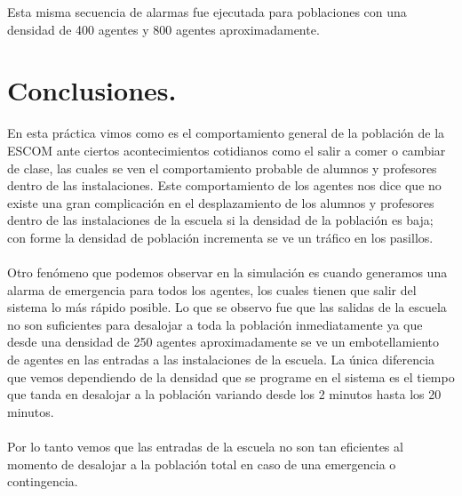 \documentclass[a4paper,10pt]{article}
\begin{document}
Esta misma secuencia de alarmas fue ejecutada para poblaciones  con una densidad de 400 agentes y 800 agentes aproximadamente.

\newpage

\section{Conclusiones.}

En esta pr\'actica vimos como es el comportamiento general de la poblaci\'on de la ESCOM ante ciertos acontecimientos cotidianos como el salir a comer o cambiar de clase, las cuales se ven el comportamiento probable de alumnos y profesores dentro de las instalaciones. Este comportamiento de los agentes nos dice que no existe una gran complicaci\'on en el desplazamiento de los alumnos y profesores dentro de las instalaciones de la escuela si la densidad de la poblaci\'on es baja; con forme la densidad de poblaci\'on incrementa se ve un tr\'afico en los pasillos.
\\ \\
Otro fen\'omeno que podemos observar en la simulaci\'on es cuando generamos una alarma de emergencia para todos los agentes, los cuales tienen que salir del sistema lo m\'as r\'apido posible. Lo que se observo fue que las salidas de la escuela no son suficientes para desalojar a toda la poblaci\'on inmediatamente ya que desde una densidad de 250 agentes aproximadamente se ve un embotellamiento de agentes en las entradas a las instalaciones de la escuela. La \'unica diferencia que vemos dependiendo de la densidad que se programe en el sistema es el tiempo que tanda en desalojar a la poblaci\'on variando desde los 2 minutos hasta los 20 minutos.
\\ \\
Por lo tanto vemos que las entradas de la escuela no son tan eficientes al momento de desalojar a la poblaci\'on total en caso de una emergencia o contingencia. 
\\
\end{document}
